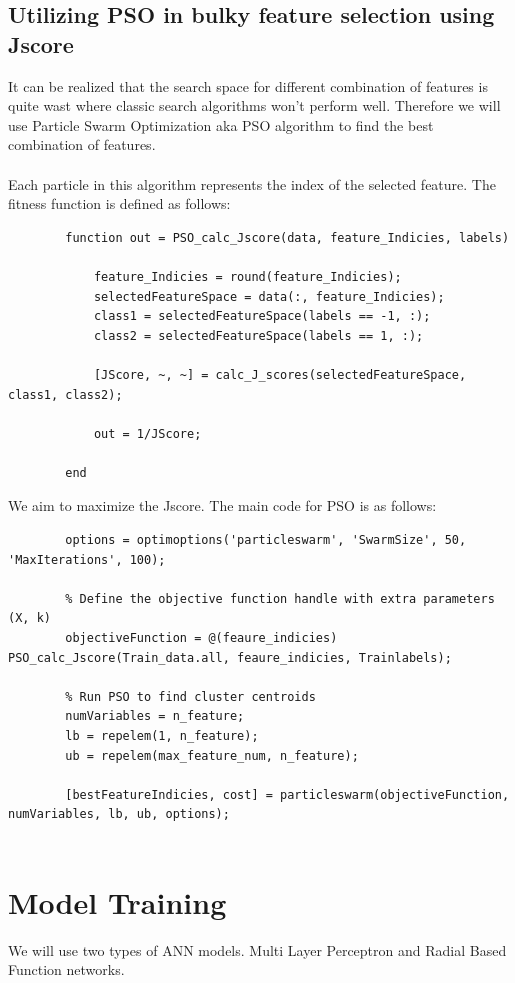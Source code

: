\documentclass[]{article}
\begin{document}
	\subsection{Utilizing PSO in bulky feature selection using Jscore}
	It can be realized that the search space for different combination of features is quite wast where classic search algorithms won't perform well. Therefore we will use Particle Swarm Optimization aka PSO algorithm to find the best combination of features.\\\\
	Each particle in this algorithm represents the index of the selected feature. The fitness function is defined as follows:
	\begin{lstlisting}
		function out = PSO_calc_Jscore(data, feature_Indicies, labels)
		
			feature_Indicies = round(feature_Indicies);
			selectedFeatureSpace = data(:, feature_Indicies); 
			class1 = selectedFeatureSpace(labels == -1, :);
			class2 = selectedFeatureSpace(labels == 1, :);
			
			[JScore, ~, ~] = calc_J_scores(selectedFeatureSpace, class1, class2);
			
			out = 1/JScore;
			
		end
	\end{lstlisting}
	We aim to maximize the Jscore.
	The main code for PSO is as follows:
	\begin{lstlisting}
		options = optimoptions('particleswarm', 'SwarmSize', 50, 'MaxIterations', 100);
		
		% Define the objective function handle with extra parameters (X, k)
		objectiveFunction = @(feaure_indicies) PSO_calc_Jscore(Train_data.all, feaure_indicies, Trainlabels);
		
		% Run PSO to find cluster centroids
		numVariables = n_feature;
		lb = repelem(1, n_feature);
		ub = repelem(max_feature_num, n_feature);
		
		[bestFeatureIndicies, cost] = particleswarm(objectiveFunction, numVariables, lb, ub, options);
		
	\end{lstlisting}

	\section{Model Training}
	We will use two types of ANN models. Multi Layer Perceptron and Radial Based Function networks.
\end{document}
